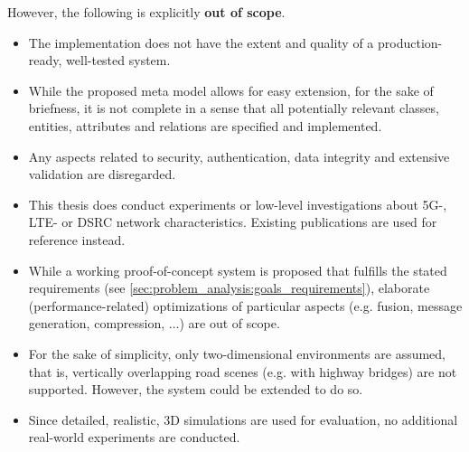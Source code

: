 However, the following is explicitly \textbf{out of scope}.
\begin{itemize}
	\item The implementation does not have the extent and quality of a production-ready, well-tested system.
	\item While the proposed meta model allows for easy extension, for the sake of briefness, it is not complete in a sense that all potentially relevant classes, entities, attributes and relations are specified and implemented.
	\item Any aspects related to security, authentication, data integrity and extensive validation are disregarded.
	\item This thesis does conduct experiments or low-level investigations about 5G-, LTE- or DSRC network characteristics. Existing publications are used for reference instead.
	\item While a working proof-of-concept system is proposed that fulfills the stated requirements (see \autoref{sec:problem_analysis:goals_requirements}), elaborate (performance-related) optimizations of particular aspects (e.g. fusion, message generation, compression, ...) are out of scope.
	\item For the sake of simplicity, only two-dimensional environments are assumed, that is, vertically overlapping road scenes (e.g. with highway bridges) are not supported. However, the system could be extended to do so.
	\item Since detailed, realistic, 3D simulations are used for evaluation, no additional real-world experiments are conducted.
\end{itemize}